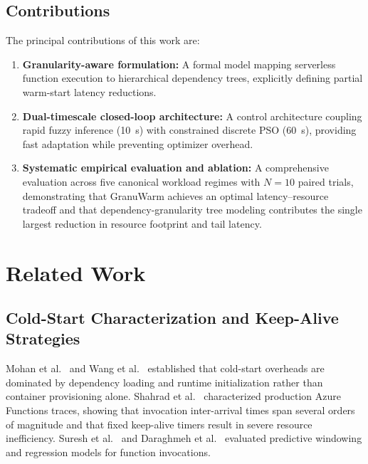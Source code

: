 \documentclass[final,5p,times,twocolumn]{elsarticle}
\begin{document}
\subsection{Contributions}

The principal contributions of this work are:
\begin{enumerate}
    \item \textbf{Granularity-aware formulation:} A formal model mapping serverless function execution to hierarchical dependency trees, explicitly defining partial warm-start latency reductions.
    \item \textbf{Dual-timescale closed-loop architecture:} A control architecture coupling rapid fuzzy inference (10~s) with constrained discrete PSO (60~s), providing fast adaptation while preventing optimizer overhead.
    \item \textbf{Systematic empirical evaluation and ablation:} A comprehensive evaluation across five canonical workload regimes with $N = 10$ paired trials, demonstrating that GranuWarm achieves an optimal latency--resource tradeoff and that dependency-granularity tree modeling contributes the single largest reduction in resource footprint and tail latency.
\end{enumerate}

\section{Related Work}

\subsection{Cold-Start Characterization and Keep-Alive Strategies}

Mohan et al.~\cite{mohan2019agile} and Wang et al.~\cite{wang2018peeking} established that cold-start overheads are dominated by dependency loading and runtime initialization rather than container provisioning alone. Shahrad et al.~\cite{shahrad2020serverless} characterized production Azure Functions traces, showing that invocation inter-arrival times span several orders of magnitude and that fixed keep-alive timers result in severe resource inefficiency. Suresh et al.~\cite{suresh2021servermore} and Daraghmeh et al.~\cite{daraghmeh2024optimizing} evaluated predictive windowing and regression models for function invocations.
\end{document}
